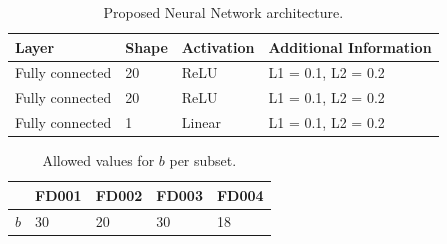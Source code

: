\documentclass[12pt]{IEEEtran}%
\begin{document}
\begin{table}
\begin{center}
\caption{Proposed Neural Network architecture.}%
%
\begin{tabular}
[c]{llll}\hline
Layer & Shape & Activation & Additional Information\\\hline\hline
Fully connected & 20 & ReLU & L1 = 0.1, L2 = 0.2\\
Fully connected & 20 & ReLU & L1 = 0.1, L2 = 0.2\\
Fully connected & 1 & Linear & L1 = 0.1, L2 = 0.2\\\hline
\end{tabular}
%
\label{table:proposed_nn}%
\end{center}
\end{table}

\begin{table}
\begin{center}
\caption{Allowed values for $b$ per subset.}%
%
\begin{tabular}
[c]{l|llll}\hline
& FD001 & FD002 & FD003 & FD004\\\hline
$b$ & 30 & 20 & 30 & 18\\\hline
\end{tabular}
%
\label{table:b_values}%
\end{center}
\end{table}
\end{document}

